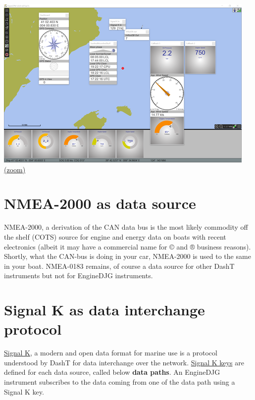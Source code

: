 \documentclass[11pt]{article}
\begin{document}
    \includegraphics{2020-02-13_DashT_EngineDJG_proto_screenshot.png}
\href{img/2020-02-13_DashT_EngineDJG_proto_screenshot.png}{(zoom)}

    \hypertarget{nmea-2000-as-data-source}{%
\section{NMEA-2000 as data source}\label{nmea-2000-as-data-source}}

    NMEA-2000, a derivation of the CAN data bus is the most likely commodity
off the shelf (COTS) source for engine and energy data on boats with
recent electronics (albeit it may have a commercial name for © and ®
business reasons). Shortly, what the CAN-bus is doing in your car,
NMEA-2000 is used to the same in your boat. NMEA-0183 remains, of course
a data source for other DashT instruments but not for EngineDJG
instruments.

    \hypertarget{signal-k-as-data-interchange-protocol}{%
\section{Signal K as data interchange
protocol}\label{signal-k-as-data-interchange-protocol}}

    \href{https://opencpn.org/wiki/dokuwiki/doku.php?id=opencpn:supplementary_software:signalk}{Signal
K}, a modern and open data format for marine use is a protocol
understood by DashT for data interchange over the network.
\href{https://github.com/SignalK/specification/blob/master/gitbook-docs/keys.md}{Signal
K keys} are defined for each data source, called below \textbf{data
paths}. An EngineDJG instrument subscribes to the data coming from one
of the data path using a Signal K key.
\end{document}
